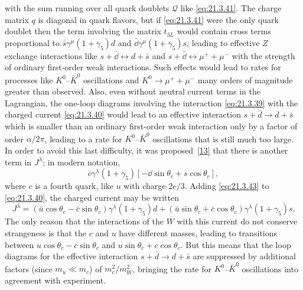 with the sum running over all quark doublets $\mathcal Q$ like \eqref{eq:21.3.41}. The charge matrix $q$ is diagonal in quark flavors, but if \eqref{eq:21.3.41} were the only quark doublet then the term involving the matrix $t_{3L}$ would contain cross terms proportional to $\bar s\gamma^\mu(1+\gamma_5)d$ and $\bar \dd\gamma^\mu(1+\gamma_5)s$, leading to effective $Z$ exchange interactions like $s+\bar \dd\leftrightarrow d+\bar s$ and $s+\bar \dd\leftrightarrow\mu^++\mu^-$ with the strength of ordinary first-order weak interactions. Such effects would lead to rates for processes like $K^0$--$\bar K^0$ oscillations and $K^0\to\mu^++\mu^-$ many orders of magnitude greater than observed. Also, even without neutral current terms in the Lagrangian, the one-loop diagrams involving the interaction \eqref{eq:21.3.39} with the charged current \eqref{eq:21.3.40} would lead to an effective interaction $s+\bar d\to d+\bar s$ which is smaller than an ordinary first-order weak interaction only by a factor of order $\alpha/2\pi$, leading to a rate for $K^0$--$\bar K^0$ oscillations that is still much too large. In order to avoid this last difficulty, it was proposed~\hyperref[ch21-ref-13]{[13]} that there is another term in $J^\lambda$; in modern notation,
\begin{equation}
\bar c\gamma^\lambda(1+\gamma_5)
\left[-\dd\sin\theta_c+s\cos\theta_c\right],
\tag{21.3.43}\label{eq:21.3.43}
\end{equation}
where $c$ is a fourth quark, like $u$ with charge $2e/3$. Adding \eqref{eq:21.3.43} to \eqref{eq:21.3.40}, the charged current may be written
\[
J^\lambda
=(\bar u\cos\theta_c-\bar c\sin\theta_c)
\gamma^\lambda(1+\gamma_5)d
+(\bar u\sin\theta_c+\bar c\cos\theta_c)
\gamma^\lambda(1+\gamma_5)s.
\]
The only reason that the interactions of the $W$ with this current do not conserve strangeness is that the $c$ and $u$ have different masses, leading to transitions between $u\cos\theta_c-c\sin\theta_c$ and $u\sin\theta_c+c\cos\theta_c$. But this means that the loop diagrams for the effective interaction $s+\bar d\to d+\bar s$ are suppressed by additional factors (since $m_u\ll m_c$) of $m_c^2/m_W^2$, bringing the rate for $K^0$--$\bar K^0$ oscillations into agreement with experiment.

